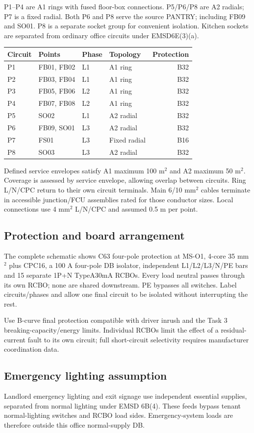 P1--P4 are A1 rings with fused floor-box connections. P5/P6/P8 are A2 radials;  P7 is a fixed radial. Both P6 and P8 serve the source PANTRY;  including FB09 and SO01. P8 is a separate socket group for convenient isolation. Kitchen sockets are separated from ordinary office circuits under EMSD6E(3)(a).
\begin{center}\begin{tabular}{llllr}\toprule
Circuit & Points & Phase & Topology & Protection\\\midrule

P1 & FB01, FB02 & L1 & A1 ring & B32 \\
P2 & FB03, FB04 & L1 & A1 ring & B32 \\
P3 & FB05, FB06 & L2 & A1 ring & B32 \\
P4 & FB07, FB08 & L2 & A1 ring & B32 \\
P5 & SO02 & L1 & A2 radial & B32 \\
P6 & FB09, SO01 & L3 & A2 radial & B32 \\
P7 & FS01 & L3 & Fixed radial & B16 \\
P8 & SO03 & L3 & A2 radial & B32 \\

\bottomrule\end{tabular}\end{center}
Defined service envelopes satisfy A1 maximum 100 m$^2$ and A2 maximum 50 m$^2$. Coverage is assessed by service envelope, allowing overlap between circuits. Ring L/N/CPC return to their own circuit terminals. Main 6/10 mm$^2$ cables terminate in accessible junction/FCU assemblies rated for those conductor sizes. Local connections use 4 mm$^2$ L/N/CPC and assumed 0.5 m per point.
\clearpage

\subsection*{Protection and board arrangement}
The complete schematic shows C63 four-pole protection at MS-O1, 4-core 35 mm$^2$ plus CPC16, a 100 A four-pole DB isolator, independent L1/L2/L3/N/PE bars and 15 separate 1P+N TypeA30mA RCBOs. Every load neutral passes through its own RCBO;  none are shared downstream. PE bypasses all switches. Label circuits/phases and allow one final circuit to be isolated without interrupting the rest.

Use B-curve final protection compatible with driver inrush and the Task 3 breaking-capacity/energy limits. Individual RCBOs limit the effect of a residual-current fault to its own circuit; full short-circuit selectivity requires manufacturer coordination data.
\subsection*{Emergency lighting assumption}
Landlord emergency lighting and exit signage use independent essential supplies, separated from normal lighting under EMSD 6B(4). These feeds bypass tenant normal-lighting switches and RCBO load sides. Emergency-system loads are therefore outside this office normal-supply DB.
